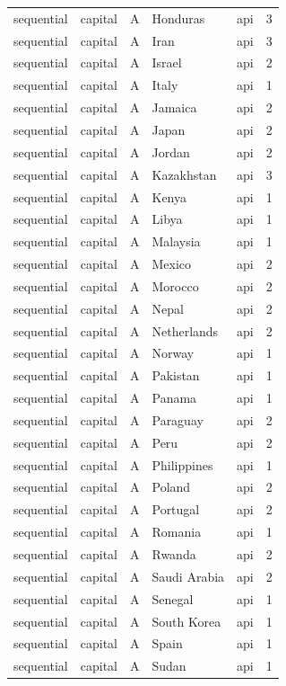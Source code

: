 \begin{tabular}{lllllr}
sequential & capital & A & Honduras & api & 3 \\
sequential & capital & A & Iran & api & 3 \\
sequential & capital & A & Israel & api & 2 \\
sequential & capital & A & Italy & api & 1 \\
sequential & capital & A & Jamaica & api & 2 \\
sequential & capital & A & Japan & api & 2 \\
sequential & capital & A & Jordan & api & 2 \\
sequential & capital & A & Kazakhstan & api & 3 \\
sequential & capital & A & Kenya & api & 1 \\
sequential & capital & A & Libya & api & 1 \\
sequential & capital & A & Malaysia & api & 1 \\
sequential & capital & A & Mexico & api & 2 \\
sequential & capital & A & Morocco & api & 2 \\
sequential & capital & A & Nepal & api & 2 \\
sequential & capital & A & Netherlands & api & 2 \\
sequential & capital & A & Norway & api & 1 \\
sequential & capital & A & Pakistan & api & 1 \\
sequential & capital & A & Panama & api & 1 \\
sequential & capital & A & Paraguay & api & 2 \\
sequential & capital & A & Peru & api & 2 \\
sequential & capital & A & Philippines & api & 1 \\
sequential & capital & A & Poland & api & 2 \\
sequential & capital & A & Portugal & api & 2 \\
sequential & capital & A & Romania & api & 1 \\
sequential & capital & A & Rwanda & api & 2 \\
sequential & capital & A & Saudi Arabia & api & 2 \\
sequential & capital & A & Senegal & api & 1 \\
sequential & capital & A & South Korea & api & 1 \\
sequential & capital & A & Spain & api & 1 \\
sequential & capital & A & Sudan & api & 1 \\

\end{tabular}
